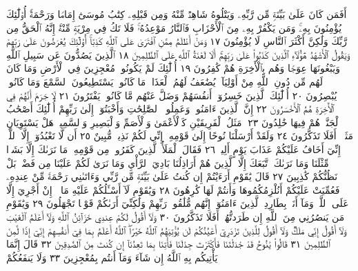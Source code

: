 أَفَمَن كَانَ عَلَىٰ بَيِّنَةࣲ مِّن رَّبِّهِۦ وَيَتْلُوهُ شَاهِدࣱ مِّنْهُ وَمِن قَبْلِهِۦ
كِتَٰبُ مُوسَىٰٓ إِمَامࣰا وَرَحْمَةًۚ أُو۟لَٰٓئِكَ يُؤْمِنُونَ بِهِۦۚ وَمَن يَكْفُرْ
بِهِۦ مِنَ ٱلْأَحْزَابِ فَٱلنَّارُ مَوْعِدُهُۥۚ فَلَا تَكُ فِي مِرْيَةࣲ مِّنْهُۚ إِنَّهُ
ٱلْحَقُّ مِن رَّبِّكَ وَلَٰكِنَّ أَكْثَرَ ٱلنَّاسِ لَا يُؤْمِنُونَ ١٧ وَمَنْ
أَظْلَمُ مِمَّنِ ٱفْتَرَىٰ عَلَى ٱللَّهِ كَذِبًاۚ أُو۟لَٰٓئِكَ يُعْرَضُونَ عَلَىٰ
رَبِّهِمْ وَيَقُولُ ٱلْأَشْهَٰدُ هَٰٓؤُلَآءِ ٱلَّذِينَ كَذَبُوا۟ عَلَىٰ رَبِّهِمْۚ
أَلَا لَعْنَةُ ٱللَّهِ عَلَى ٱلظَّٰلِمِينَ ١٨ ٱلَّذِينَ يَصُدُّونَ عَن سَبِيلِ
ٱللَّهِ وَيَبْغُونَهَا عِوَجࣰا وَهُم بِٱلْأٓخِرَةِ هُمْ كَٰفِرُونَ ١٩
أُو۟لَٰٓئِكَ لَمْ يَكُونُوا۟ مُعْجِزِينَ فِي ٱلْأَرْضِ وَمَا كَانَ لَهُم مِّن دُونِ
ٱللَّهِ مِنْ أَوْلِيَآءَۘ يُضَٰعَفُ لَهُمُ ٱلْعَذَابُۚ مَا كَانُوا۟ يَسْتَطِيعُونَ
ٱلسَّمْعَ وَمَا كَانُوا۟ يُبْصِرُونَ ٢٠ أُو۟لَٰٓئِكَ ٱلَّذِينَ خَسِرُوٓا۟
أَنفُسَهُمْ وَضَلَّ عَنْهُم مَّا كَانُوا۟ يَفْتَرُونَ ٢١ لَا جَرَمَ أَنَّهُمْ
فِي ٱلْأٓخِرَةِ هُمُ ٱلْأَخْسَرُونَ ٢٢ إِنَّ ٱلَّذِينَ ءَامَنُوا۟ وَعَمِلُوا۟
ٱلصَّٰلِحَٰتِ وَأَخْبَتُوٓا۟ إِلَىٰ رَبِّهِمْ أُو۟لَٰٓئِكَ أَصْحَٰبُ ٱلْجَنَّةِۖ
هُمْ فِيهَا خَٰلِدُونَ ٢٣۞ مَثَلُ ٱلْفَرِيقَيْنِ كَٱلْأَعْمَىٰ وَٱلْأَصَمِّ
وَٱلْبَصِيرِ وَٱلسَّمِيعِۚ هَلْ يَسْتَوِيَانِ مَثَلًاۚ أَفَلَا تَذَكَّرُونَ ٢٤
وَلَقَدْ أَرْسَلْنَا نُوحًا إِلَىٰ قَوْمِهِۦٓ إِنِّي لَكُمْ نَذِيرࣱ مُّبِينٌ ٢٥
أَن لَّا تَعْبُدُوٓا۟ إِلَّا ٱللَّهَۖ إِنِّيٓ أَخَافُ عَلَيْكُمْ عَذَابَ يَوْمٍ أَلِيمࣲ ٢٦
فَقَالَ ٱلْمَلَأُ ٱلَّذِينَ كَفَرُوا۟ مِن قَوْمِهِۦ مَا نَرَىٰكَ إِلَّا بَشَرࣰا مِّثْلَنَا
وَمَا نَرَىٰكَ ٱتَّبَعَكَ إِلَّا ٱلَّذِينَ هُمْ أَرَاذِلُنَا بَادِيَ ٱلرَّأْيِ
وَمَا نَرَىٰ لَكُمْ عَلَيْنَا مِن فَضْلِۭ بَلْ نَظُنُّكُمْ كَٰذِبِينَ ٢٧
قَالَ يَٰقَوْمِ أَرَءَيْتُمْ إِن كُنتُ عَلَىٰ بَيِّنَةࣲ مِّن رَّبِّي وَءَاتَىٰنِي رَحْمَةࣰ مِّنْ
عِندِهِۦ فَعُمِّيَتْ عَلَيْكُمْ أَنُلْزِمُكُمُوهَا وَأَنتُمْ لَهَا كَٰرِهُونَ ٢٨
وَيَٰقَوْمِ لَآ أَسْـَٔلُكُمْ عَلَيْهِ مَالًاۖ إِنْ أَجْرِيَ إِلَّا عَلَى ٱللَّهِۚ وَمَآ أَنَا۠
بِطَارِدِ ٱلَّذِينَ ءَامَنُوٓا۟ۚ إِنَّهُم مُّلَٰقُوا۟ رَبِّهِمْ وَلَٰكِنِّيٓ أَرَىٰكُمْ قَوْمࣰا
تَجْهَلُونَ ٢٩ وَيَٰقَوْمِ مَن يَنصُرُنِي مِنَ ٱللَّهِ إِن طَرَدتُّهُمْۚ أَفَلَا
تَذَكَّرُونَ ٣٠ وَلَآ أَقُولُ لَكُمْ عِندِي خَزَآئِنُ ٱللَّهِ وَلَآ
أَعْلَمُ ٱلْغَيْبَ وَلَآ أَقُولُ إِنِّي مَلَكࣱ وَلَآ أَقُولُ لِلَّذِينَ تَزْدَرِيٓ
أَعْيُنُكُمْ لَن يُؤْتِيَهُمُ ٱللَّهُ خَيْرًاۖ ٱللَّهُ أَعْلَمُ بِمَا فِيٓ أَنفُسِهِمْ إِنِّيٓ
إِذࣰا لَّمِنَ ٱلظَّٰلِمِينَ ٣١ قَالُوا۟ يَٰنُوحُ قَدْ جَٰدَلْتَنَا فَأَكْثَرْتَ جِدَٰلَنَا
فَأْتِنَا بِمَا تَعِدُنَآ إِن كُنتَ مِنَ ٱلصَّٰدِقِينَ ٣٢ قَالَ إِنَّمَا
يَأْتِيكُم بِهِ ٱللَّهُ إِن شَآءَ وَمَآ أَنتُم بِمُعْجِزِينَ ٣٣ وَلَا يَنفَعُكُمْ

